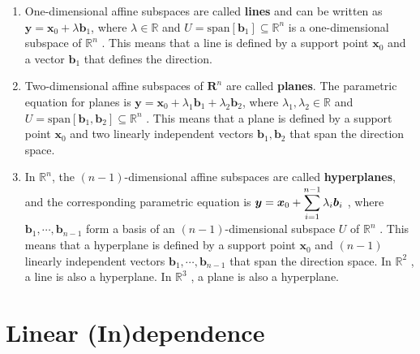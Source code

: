 \begin{enumerate}
    \item One-dimensional affine subspaces are called \textbf{lines} and can be written as $\bm{y} = \bm{x}_0 + \lambda \bm{b}_1$, where $\lambda  \in \mathbb{R}$ and $U = \text{span}[\bm{b}_1] \subseteq \mathbb{R}^n$ is a one-dimensional subspace of $\mathbb{R}^n$ . 
    This means that a line is defined by a support point $\bm{x}_0$ and a vector $\bm{b}_1$ that defines the direction.
    \hfill \cite{mfml/book/mml/Deisenroth-Faisal-Ong}

    \item Two-dimensional affine subspaces of $\bm{R}^n$ are called \textbf{planes}. 
    The parametric equation for planes is $\bm{y} = \bm{x}_0 + \lambda _1 \bm{b}_1 + \lambda _2 \bm{b}_2$, where $\lambda _1, \lambda _2 \in \mathbb{R}$ and $U = \text{span}[\bm{b}_1, \bm{b}_2] \subseteq \mathbb{R}^n$ . 
    This means that a plane is defined by a support point $\bm{x}_0$ and two linearly independent vectors $\bm{b}_1, \bm{b}_2$ that span the direction space.
    \hfill \cite{mfml/book/mml/Deisenroth-Faisal-Ong}

    \item In $\mathbb{R}^n$, the $(n - 1)$-dimensional affine subspaces are called \textbf{hyperplanes}, and the corresponding parametric equation is $\bm{y} = \bm{x}_0 + \displaystyle\sum^ {n-1} _{i=1} \lambda_i \bm{b}_i$ , where $\bm{b}_1, \cdots , \bm{b}_{n-1}$ form a basis of an $(n - 1)$-dimensional subspace $U$ of $\mathbb{R}^n$ . 
    This means that a hyperplane is defined by a support point $\bm{x}_0$ and $(n - 1)$ linearly independent vectors $\bm{b}_1, \cdots , \bm{b}_{n-1}$ that span the direction space. 
    In $\mathbb{R}^2$ , a line is also a hyperplane. 
    In $\mathbb{R}^3$ , a plane is also a hyperplane.
    \hfill \cite{mfml/book/mml/Deisenroth-Faisal-Ong}

    
\end{enumerate}

















\section{Linear (In)dependence}

